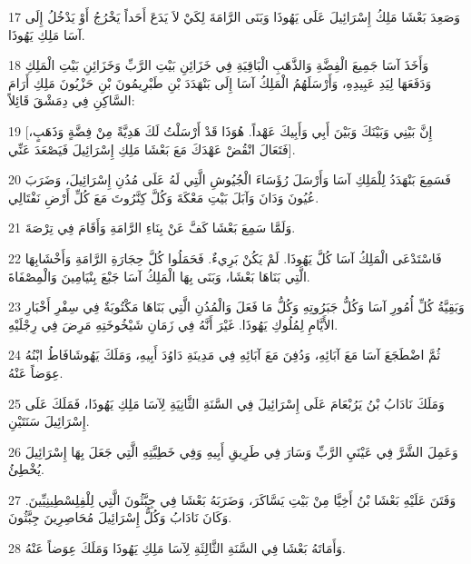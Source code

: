 \par 17 وَصَعِدَ بَعْشَا مَلِكُ إِسْرَائِيلَ عَلَى يَهُوذَا وَبَنَى الرَّامَةَ لِكَيْ لاَ يَدَعَ أَحَداً يَخْرُجُ أَوْ يَدْخُلُ إِلَى آسَا مَلِكِ يَهُوذَا.
\par 18 وَأَخَذَ آسَا جَمِيعَ الْفِضَّةِ وَالذَّهَبِ الْبَاقِيَةِ فِي خَزَائِنِ بَيْتِ الرَّبِّ وَخَزَائِنِ بَيْتِ الْمَلِكِ وَدَفَعَهَا لِيَدِ عَبِيدِهِ، وَأَرْسَلَهُمُ الْمَلِكُ آسَا إِلَى بَنْهَدَدَ بْنِ طَبْرِيمُونَ بْنِ حَزْيُونَ مَلِكِ أَرَامَ السَّاكِنِ فِي دِمَشْقَ قَائِلاً:
\par 19 [إِنَّ بَيْنِي وَبَيْنَكَ وَبَيْنَ أَبِي وَأَبِيكَ عَهْداً. هُوَذَا قَدْ أَرْسَلْتُ لَكَ هَدِيَّةً مِنْ فِضَّةٍ وَذَهَبٍ، فَتَعَالَ انْقُضْ عَهْدَكَ مَعَ بَعْشَا مَلِكِ إِسْرَائِيلَ فَيَصْعَدَ عَنِّي].
\par 20 فَسَمِعَ بَنْهَدَدُ لِلْمَلِكِ آسَا وَأَرْسَلَ رُؤَسَاءَ الْجُيُوشِ الَّتِي لَهُ عَلَى مُدُنِ إِسْرَائِيلَ، وَضَرَبَ عُيُونَ وَدَانَ وَآبَلَ بَيْتِ مَعْكَةَ وَكُلَّ كِنَّرُوتَ مَعَ كُلِّ أَرْضِ نَفْتَالِي.
\par 21 وَلَمَّا سَمِعَ بَعْشَا كَفَّ عَنْ بِنَاءِ الرَّامَةِ وَأَقَامَ فِي تِرْصَةَ.
\par 22 فَاسْتَدْعَى الْمَلِكُ آسَا كُلَّ يَهُوذَا. لَمْ يَكُنْ بَرِيءٌ. فَحَمَلُوا كُلَّ حِجَارَةِ الرَّامَةِ وَأَخْشَابِهَا الَّتِي بَنَاهَا بَعْشَا، وَبَنَى بِهَا الْمَلِكُ آسَا جَبْعَ بِنْيَامِينَ وَالْمِصْفَاةَ.
\par 23 وَبَقِيَّةُ كُلِّ أُمُورِ آسَا وَكُلُّ جَبَرُوتِهِ وَكُلُّ مَا فَعَلَ وَالْمُدُنِ الَّتِي بَنَاهَا مَكْتُوبَةٌ فِي سِفْرِ أَخْبَارِ الأَيَّامِ لِمُلُوكِ يَهُوذَا. غَيْرَ أَنَّهُ فِي زَمَانِ شَيْخُوخَتِهِ مَرِضَ فِي رِجْلَيْهِ.
\par 24 ثُمَّ اضْطَجَعَ آسَا مَعَ آبَائِهِ، وَدُفِنَ مَعَ آبَائِهِ فِي مَدِينَةِ دَاوُدَ أَبِيهِ، وَمَلَكَ يَهُوشَافَاطُ ابْنُهُ عِوَضاً عَنْهُ.
\par 25 وَمَلَكَ نَادَابُ بْنُ يَرُبْعَامَ عَلَى إِسْرَائِيلَ فِي السَّنَةِ الثَّانِيَةِ لِآسَا مَلِكِ يَهُوذَا، فَمَلَكَ عَلَى إِسْرَائِيلَ سَنَتَيْنِ.
\par 26 وَعَمِلَ الشَّرَّ فِي عَيْنَيِ الرَّبِّ وَسَارَ فِي طَرِيقِ أَبِيهِ وَفِي خَطِيَّتِهِ الَّتِي جَعَلَ بِهَا إِسْرَائِيلَ يُخْطِئُ.
\par 27 وَفَتَنَ عَلَيْهِ بَعْشَا بْنُ أَخِيَّا مِنْ بَيْتِ يَسَّاكَرَ، وَضَرَبَهُ بَعْشَا فِي جِبَّثُونَ الَّتِي لِلْفِلِسْطِينِيِّينَ. وَكَانَ نَادَابُ وَكُلُّ إِسْرَائِيلَ مُحَاصِرِينَ جِبَّثُونَ.
\par 28 وَأَمَاتَهُ بَعْشَا فِي السَّنَةِ الثَّالِثَةِ لِآسَا مَلِكِ يَهُوذَا وَمَلَكَ عِوَضاً عَنْهُ.
